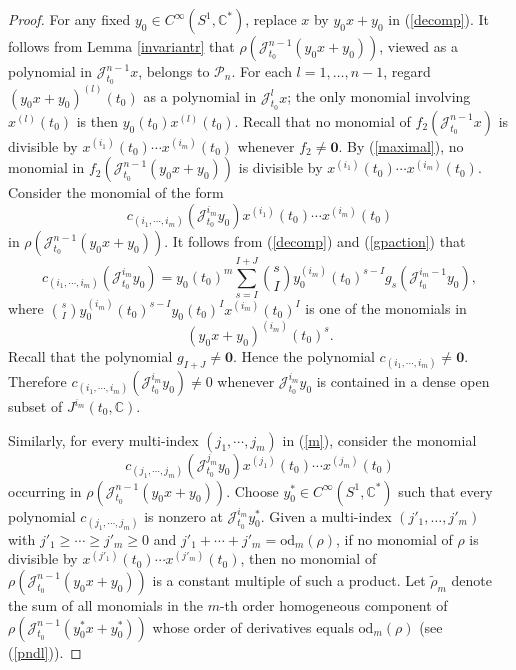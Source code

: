 \documentclass[11pt]{amsart}
\numberwithin{equation}{section}
\newcommand{\di}{\displaystyle}
\newcommand{\bc}{\mathbb{C}}
\newcommand{\sd}{\mathrm{od}}
\newcommand{\sjt}{\mathscr{J}_{t_0}}
\newcommand{\sjm}{\mathscr{J}^{n-1}_{t_0}}
\newcommand{\sjmx}{\mathscr{J}^{n-1}_{t_0} x}
\newcommand{\cisoca}{C^{\infty}\left(S^1, \mathbb{C}^{\ast} \right)}
\newcommand{\pn}{\mathscr{P}_{n}}
\newcommand{\zero}{\mathbf{0}}
\begin{document}
\begin{proof}
  For any fixed $\di y_0 \in \cisoca$,
  replace $x$ by $y_0x+y_0$ in (\ref{decomp}). It follows from Lemma \ref{invariantr} that
  $\di \rho(\sjm(y_0x+y_0))$,  viewed as a polynomial in $\di \sjmx$, belongs to $\pn$.
  For each \(l=1,\dots,n-1\),
  regard $(y_0x+y_0)^{(l)}(t_0)$
  as a polynomial in $\sjt^{l} x$; the
   only monomial involving $x^{(l)}(t_0)$ is then $y_0(t_0) x^{(l)}(t_0)$.
  Recall that no monomial of $f_2(\sjm x)$ is divisible
by $\di x^{(i_1)}(t_0) \cdots x^{(i_m)}(t_0)$ whenever $f_2 \not= \zero$.
  By (\ref{maximal}), no
  monomial in $\di f_2(\sjm(y_0x+y_0))$ is divisible
  by $\di x^{(i_1)}(t_0) \cdots x^{(i_m)}(t_0)$.
  Consider the monomial of the form
  $$c_{(i_1, \cdots, i_m)}(\sjt^{i_m} y_0) x^{(i_1)}(t_0) \cdots x^{(i_m)}(t_0)$$
  in
  $\di \rho(\sjm(y_0x+y_0))$.
  It follows from (\ref{decomp}) and (\ref{gpaction}) that
  \begin{equation*}
  c_{(i_1, \cdots, i_m)}(\sjt^{i_m} y_0)=y_0(t_0)^m \sum_{s=I}^{I+J} \binom{s}{I} y_0^{(i_m)}(t_0)^{s-I} g_s(\sjt^{i_m-1}y_0),
  \end{equation*}
  where $\binom{s}{I} y_0^{(i_m)}(t_0)^{s-I} y_0(t_0)^I x^{(i_m)}(t_0)^I$ is one of the monomials in
  $$\di (y_0x+y_0)^{(i_m)}(t_0)^s.$$
  Recall that the polynomial $\di g_{I+J} \not=\zero$. Hence the polynomial $c_{(i_1, \cdots, i_m)} \not=\zero$.
  Therefore $c_{(i_1, \cdots, i_m)}(\sjt^{i_m} y_0)\not=0$ whenever $\sjt^{i_m} y_0$
  is contained in a dense open subset of $J^{i_m}(t_0, \bc)$.

  Similarly,
  for every multi-index $(j_1, \cdots, j_m)$ in (\ref{m}),
  consider the monomial
  \begin{equation*} \label{c}
  c_{(j_1, \cdots, j_m)}(\sjt^{j_m} y_0) x^{(j_1)}(t_0) \cdots x^{(j_m)}(t_0)
  \end{equation*}
  occurring in
  $\di \rho(\sjm(y_0x+y_0))$.
Choose $y_0^{\ast} \in \cisoca$ such that every polynomial $c_{(j_1, \cdots, j_m)}$
is nonzero at $\sjt^{i_m} y_0^{\ast}$.
Given a multi-index $(j'_1,\dots,j'_m)$ with $j'_1\ge\cdots\ge j'_m\ge0$ and $j'_1+\cdots+j'_m=\sd_m(\rho)$, if no monomial of $\rho$ is divisible by $x^{(j'_1)}(t_0)\cdots x^{(j'_m)}(t_0)$, then no monomial of $\di\rho(\sjm(y_0x+y_0))$ is a constant multiple of such a product.
  Let $\tilde{\rho}_m$ denote the sum
  of all monomials in the $m$-th order homogeneous component of $\di \rho(\sjm(y_0^{\ast}x+y_0^{\ast}))$
  whose order of derivatives equals $\sd_m(\rho)$ (see (\ref{pndl})).
\end{proof}
\end{document}
